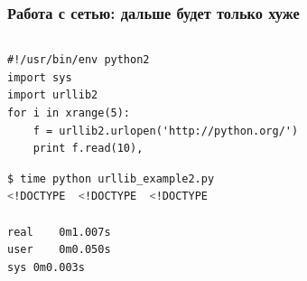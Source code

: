 \documentclass[aspectratio=169]{beamer}
\begin{document}
\begin{frame}[fragile]
  \frametitle{Работа с сетью: дальше будет только хуже}

  \begin{columns}
    \begin{column}{.8\textwidth}

      \begin{lstlisting}[caption=urllib\_example2.py]
#!/usr/bin/env python2
import sys
import urllib2
for i in xrange(5):
    f = urllib2.urlopen('http://python.org/')
    print f.read(10),
      \end{lstlisting}

      \pause

      \begin{lstlisting}[language=sh]
$ time python urllib_example2.py
<!DOCTYPE  <!DOCTYPE  <!DOCTYPE

real	0m1.007s
user	0m0.050s
sys	0m0.003s
      \end{lstlisting}
    
    \end{column}
    \hfill
    \pause


\end{columns}
\end{frame}
\end{document}
